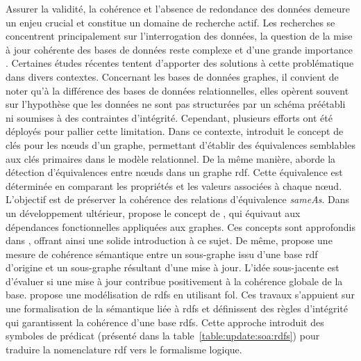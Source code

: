 Assurer la validité, la cohérence et l'absence de redondance des données demeure un enjeu crucial et constitue un domaine de recherche actif. 
Les recherches se concentrent principalement sur l'interrogation des données, la question de la mise à jour cohérente des bases de données reste complexe et d'une grande importance \cite{halfeldferrariUpdateRulesDatalog1998,scheweLimitationsRuleTriggering1998}.
Certaines études récentes tentent d'apporter des solutions à cette problématique dans divers contextes.
Concernant les bases de données graphes, il convient de noter qu'à la différence des bases de données relationnelles, elles opèrent souvent sur l'hypothèse que les données ne sont pas structurées par un schéma préétabli ni soumises à des contraintes d'intégrité.
Cependant, plusieurs efforts ont été déployés pour pallier cette limitation.
Dans ce contexte, \cite{fanKeysGraphs2015} introduit le concept de clés pour les nœuds d'un graphe, permettant d'établir des équivalences semblables aux clés primaires dans le modèle relationnel.
De la même manière, \cite{raadDetectionLiensIdentite2018} aborde la détection d'équivalences entre nœuds dans un graphe \gls{rdf}.
Cette équivalence est déterminée en comparant les propriétés et les valeurs associées à chaque nœud.
L'objectif est de préserver la cohérence des relations d'équivalence \textit{sameAs}.
Dans un développement ultérieur, \cite{fanDependenciesGraphs2019} propose le concept de , qui équivaut aux dépendances fonctionnelles appliquées aux graphes.
Ces concepts sont approfondis dans \cite{anglesPgkeysKeysProperty2021,bonifatiQueryingGraphs2018}, offrant ainsi une solide introduction à ce sujet.
De même, \cite{maillotConsistencyEvaluationRDF2014} propose une mesure de cohérence sémantique entre un sous-graphe issu d'une base \gls{rdf} d'origine et un sous-graphe résultant d'une mise à jour.
L'idée sous-jacente est d'évaluer si une mise à jour contribue positivement à la cohérence globale de la base.
\cite{flourisFormalFoundationsRDF2013} propose une modélisation de \gls{rdfs} en utilisant \gls{fol}.
Ces travaux s'appuient sur une formalisation de la sémantique liée à \gls{rdfs} et définissent des règles d'intégrité qui garantissent la cohérence d'une base \gls{rdfs}.
Cette approche introduit des symboles de prédicat (présenté dans la table~\ref{table:update:soa:rdfs}) pour traduire la nomenclature \gls{rdf} vers le formalisme logique.

